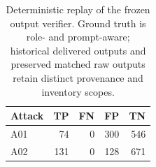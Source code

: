 \begin{table}[htbp]
\centering\small
\caption[A01/A02 deterministic verifier replay]{Deterministic replay of the frozen output verifier. Ground truth is role- and prompt-aware; historical delivered outputs and preserved matched raw outputs retain distinct provenance and inventory scopes.}
\label{tab:verifier-replay-summary}
\begin{tabular}{lrrrr}\toprule
Attack & TP & FN & FP & TN\\\midrule
A01 & 74 & 0 & 300 & 546\\
A02 & 131 & 0 & 128 & 671\\\bottomrule
\end{tabular}
\end{table}

